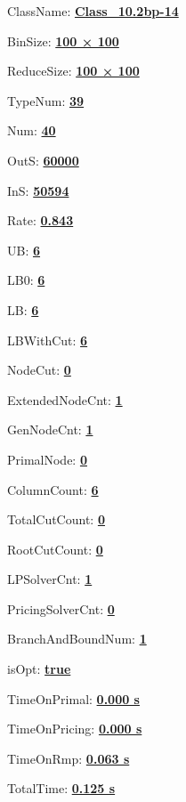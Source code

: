 \documentclass[11pt]{article}
\begin{document}
\pagestyle{empty}


ClassName: \underline{\textbf{Class_10.2bp-14}}
\par
BinSize: \underline{\textbf{100 × 100}}
\par
ReduceSize: \underline{\textbf{100 × 100}}
\par
TypeNum: \underline{\textbf{39}}
\par
Num: \underline{\textbf{40}}
\par
OutS: \underline{\textbf{60000}}
\par
InS: \underline{\textbf{50594}}
\par
Rate: \underline{\textbf{0.843}}
\par
UB: \underline{\textbf{6}}
\par
LB0: \underline{\textbf{6}}
\par
LB: \underline{\textbf{6}}
\par
LBWithCut: \underline{\textbf{6}}
\par
NodeCut: \underline{\textbf{0}}
\par
ExtendedNodeCnt: \underline{\textbf{1}}
\par
GenNodeCnt: \underline{\textbf{1}}
\par
PrimalNode: \underline{\textbf{0}}
\par
ColumnCount: \underline{\textbf{6}}
\par
TotalCutCount: \underline{\textbf{0}}
\par
RootCutCount: \underline{\textbf{0}}
\par
LPSolverCnt: \underline{\textbf{1}}
\par
PricingSolverCnt: \underline{\textbf{0}}
\par
BranchAndBoundNum: \underline{\textbf{1}}
\par
isOpt: \underline{\textbf{true}}
\par
TimeOnPrimal: \underline{\textbf{0.000 s}}
\par
TimeOnPricing: \underline{\textbf{0.000 s}}
\par
TimeOnRmp: \underline{\textbf{0.063 s}}
\par
TotalTime: \underline{\textbf{0.125 s}}
\par
\newpage


\end{document}
